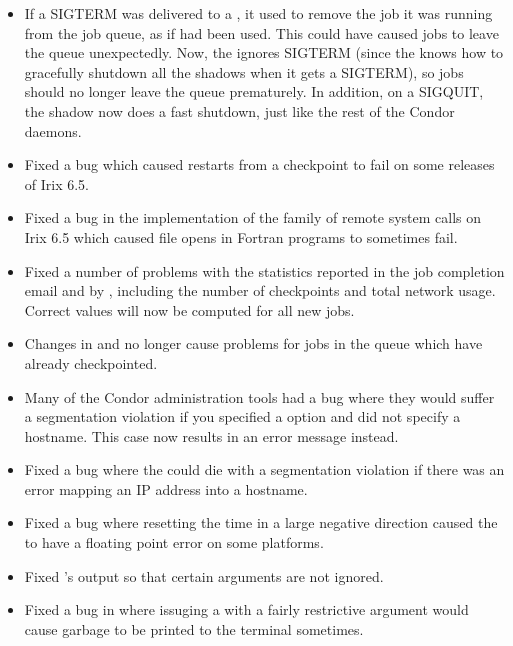 \begin{itemize}

\item If a SIGTERM was delivered to a , it used to
remove the job it was running from the job queue, as if 
had been used.
This could have caused jobs to leave the queue unexpectedly.
Now, the  ignores SIGTERM (since the 
knows how to gracefully shutdown all the shadows when it gets a
SIGTERM), so jobs should no longer leave the queue prematurely.
In addition, on a SIGQUIT, the shadow now does a fast shutdown, just
like the rest of the Condor daemons.

\item Fixed a bug which caused restarts from a checkpoint to fail on
some releases of Irix 6.5.

\item Fixed a bug in the implementation of the  family
of remote system calls on Irix 6.5 which caused file opens in Fortran
programs to sometimes fail.

\item Fixed a number of problems with the statistics reported in the
job completion email and by  , including the
number of checkpoints and total network usage.  Correct values will
now be computed for all new jobs.

\item Changes in  and
 no longer cause problems for jobs in the
queue which have already checkpointed.

\item Many of the Condor administration tools had a bug where they
would suffer a segmentation violation if you specified a  
option and did not specify a hostname.
This case now results in an error message instead.

\item Fixed a bug where the  could die with a
segmentation violation if there was an error mapping an IP address
into a hostname.

\item Fixed a bug where resetting the time in a large negative direction
caused the  to have a floating point error on some
platforms.

\item Fixed 's output so that certain arguments are not ignored.

\item Fixed a bug in  where issuging a  with a
fairly restrictive  argument would cause garbage to be
printed to the terminal sometimes.
\end{itemize}

